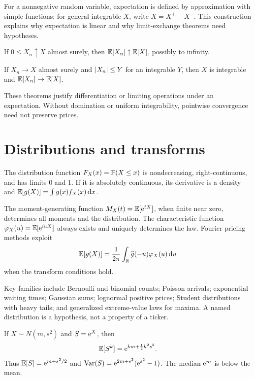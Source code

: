 For a nonnegative random variable, expectation is defined by approximation with
simple functions; for general integrable $X$, write $X=X^+-X^-$. This construction
explains why expectation is linear and why limit-exchange theorems need hypotheses.

\begin{theorem}
If $0\leq X_n\uparrow X$ almost surely, then $\operatorname{\mathbb E}[X_n]\uparrow\operatorname{\mathbb E}[X]$, possibly to
infinity.
\end{theorem}

\begin{theorem}
If $X_n\to X$ almost surely and $\left|X_n\right|\leq Y$ for an integrable $Y$, then
$X$ is integrable and $\operatorname{\mathbb E}[X_n]\to\operatorname{\mathbb E}[X]$.
\end{theorem}

These theorems justify differentiation or limiting operations under an expectation.
Without domination or uniform integrability, pointwise convergence need not preserve
prices.

\section{Distributions and transforms}

The distribution function $F_X(x)=\mathbb P(X\leq x)$ is nondecreasing, right-continuous,
and has limits $0$ and $1$. If it is absolutely continuous, its derivative is a
density and
$\operatorname{\mathbb E}[g(X)]=\int g(x)f_X(x)\,\mathrm d x$.

The moment-generating function $M_X(t)=\operatorname{\mathbb E}[\mathrm e^{tX}]$, when finite near zero,
determines all moments and the distribution. The characteristic function
$\varphi_X(u)=\operatorname{\mathbb E}[\mathrm e^{iuX}]$ always exists and uniquely determines the law. Fourier
pricing methods exploit
\[
\operatorname{\mathbb E}[g(X)]=\frac{1}{2\pi}\int_{\mathbb R}\widehat g(-u)\varphi_X(u)\,\mathrm d u
\]
when the transform conditions hold.

Key families include Bernoulli and binomial counts; Poisson arrivals; exponential
waiting times; Gaussian sums; lognormal positive prices; Student distributions with
heavy tails; and generalized extreme-value laws for maxima. A named distribution is
a hypothesis, not a property of a ticker.

\begin{example}
If $X\sim N(m,s^2)$ and $S=\mathrm e^X$, then
\[
\operatorname{\mathbb E}[S^k]=\mathrm e^{km+\frac12k^2s^2}.
\]
Thus $\operatorname{\mathbb E}[S]=\mathrm e^{m+s^2/2}$ and
$\operatorname{Var}(S)=\mathrm e^{2m+s^2}(\mathrm e^{s^2}-1)$. The median $\mathrm e^m$ is below the mean.
\end{example}

